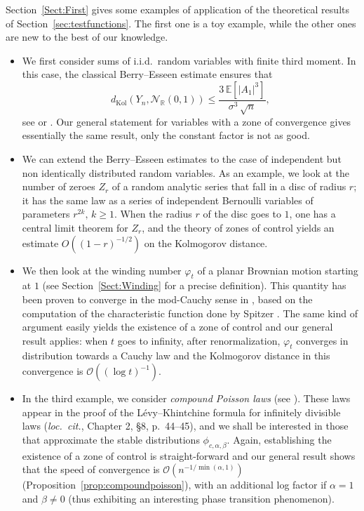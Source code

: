 \documentclass[envcountsame]{svmult}
\def\O{\mathcal{O}}
\newcommand{\R}{\mathbb{R}}
\newcommand{\esper}{\mathbb{E}}
\newcommand{\dkol}{d_\mathrm{Kol}}
\newcommand{\gauss}{\mathcal{N}_{\R}(0,1)}
\begin{document}
Section~\ref{Sect:First} gives some examples of application of the theoretical results of Section~\ref{sec:testfunctions}. The first one is a toy example, while the other ones are new to the best of our knowledge.
\begin{itemize}
  \item We first consider sums of i.i.d.~random variables with finite third moment.
    In this case, the classical Berry--Esseen estimate ensures that
    $$\dkol(Y_n,\gauss) \leq \frac{3\,\esper[|A_1|^3]}{\sigma^3\,\sqrt{n}},$$
    see \cite{Berry1941} or \cite[\S XVI.5, Theorem 1]{Fel71}.
    Our general statement for variables with a zone of convergence
    gives essentially the same result, only the constant factor is not as good.

    \item We can extend the Berry--Esseen estimates to the case of independent but non identically distributed random variables. As an example, we look at the number of zeroes $Z_r$ of a random analytic series that fall in a disc of radius $r$; it has the same law as a series of independent Bernoulli variables of parameters $r^{2k},\,k\geq 1$. When the radius $r$ of the disc goes to $1$, one has a central limit theorem for $Z_r$, and the theory of zones of control yields an estimate $O((1-r)^{-1/2})$ on the Kolmogorov distance.

  \item We then look at the winding number $\varphi_t$ of a planar Brownian motion starting at $1$ 
    (see Section~\ref{Sect:Winding} for a precise definition). 
    This quantity has been proven to converge in the mod-Cauchy sense in \cite{DKN11},
    based on the computation of the characteristic function done by Spitzer \cite{Spi58}. The same kind of argument easily yields the existence of a zone of control and our general result applies:
    when $t$ goes to infinity, after renormalization, $\varphi_t$ converges in distribution towards a Cauchy law
    and the Kolmogorov distance in this convergence is  $\O((\log t)^{-1})$. 

  \item In the third example, we consider {\em compound Poisson laws} (see \cite[Chapter 1, \S4]{Sato99}).
    These laws appear in the proof of the Lévy--Khintchine formula for infinitely divisible laws (\emph{loc.~cit.}, Chapter 2, \S8, p.~44--45), and we shall be interested in those that approximate the stable distributions $\phi_{c,\alpha,\beta}$. Again, establishing the existence of a zone of control is straight-forward
    and our general result shows that the speed of convergence is $\O(n^{-1/\min(\alpha,1)})$ (Proposition~\ref{prop:compoundpoisson}),
    with an additional log factor if $\alpha=1$ and $\beta \ne 0$ (thus exhibiting an interesting phase transition phenomenon).


\end{itemize}
\end{document}
